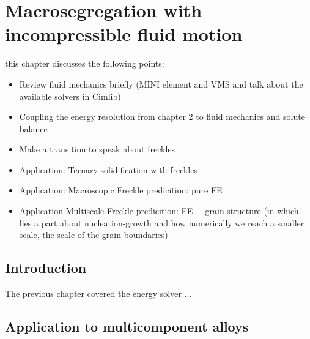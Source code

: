 \chapter{Macrosegregation with incompressible fluid motion}
\begin{nolinkcolors} 
\minitoc
\end{nolinkcolors}
\newpage

this chapter discusses the following points:
\begin{itemize}
\item Review fluid mechanics briefly (MINI element and VMS and talk about the available solvers in Cimlib)
\item Coupling the energy resolution from chapter 2 to fluid mechanics and solute balance
\item Make a transition to speak about freckles
\item Application: Ternary solidification with freckles
\item Application: Macroscopic Freckle predicition: pure FE
\item Application Multiscale Freckle predicition: FE + grain structure (in which lies a part about nucleation-growth and how numerically 
		we reach a smaller scale, the scale of the grain boundaries)
\end{itemize}

\section{Introduction}
The previous chapter covered the energy solver ...


\section{Application to multicomponent alloys}

